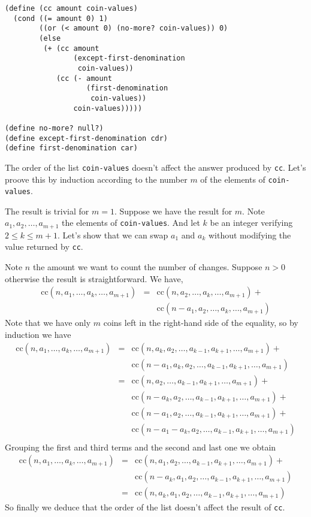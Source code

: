 \documentclass[a4paper,12pt]{article}
\begin{document}
\begin{lstlisting}
(define (cc amount coin-values)
  (cond ((= amount 0) 1)
        ((or (< amount 0) (no-more? coin-values)) 0)
        (else
         (+ (cc amount
                (except-first-denomination
                 coin-values))
            (cc (- amount
                   (first-denomination
                    coin-values))
                coin-values)))))

(define no-more? null?)
(define except-first-denomination cdr)
(define first-denomination car)
\end{lstlisting}
The order of the list \lstinline!coin-values! doesn't affect the
answer produced by \lstinline!cc!.  Let's proove this by induction
according to the number $m$ of the elements of
\lstinline!coin-values!.

The result is trivial for $m = 1$.  Suppose we have the result for
$m$.  Note $a_1, a_2, \ldots, a_{m+1}$ the elements of
\lstinline!coin-values!.  And let $k$ be an integer verifying
$ 2 \le k \le m+1$.  Let's show that we can swap $a_1$ and $a_k$
without modifying the value returned by \lstinline!cc!.

Note $n$ the amount we want to count the number of changes. Suppose
$n > 0$ otherwise the result is straightforward.  We have,
\begin{eqnarray*}
  \mathrm{cc}(n, a_1,\ldots,a_k,\ldots,a_{m+1}) &=&
  \mathrm{cc}(n, a_2,\ldots,a_k,\ldots,a_{m+1}) + \\ &&
  \mathrm{cc}(n-a_1,a_2,\ldots,a_k,\ldots,a_{m+1}) 
\end{eqnarray*}
Note that we have only $m$ coins left in the right-hand side of the
equality, so by induction we have
\begin{eqnarray*}
  \mathrm{cc}(n, a_1,\ldots,a_k,\ldots,a_{m+1}) &=&
  \mathrm{cc}(n, a_k, a_2,\ldots,a_{k-1},a_{k+1},\ldots,a_{m+1}) +
  \\&&
  \mathrm{cc}(n-a_1, a_k, a_2, \ldots, a_{k-1}, a_{k+1}, \ldots,
  a_{m+1}) \\ &=&
  \mathrm{cc}(n, a_2, \ldots, a_{k-1},a_{k+1},\ldots, a_{m+1}) + \\ &&
  \mathrm{cc}(n-a_k, a_2, \ldots, a_{k-1}, a_{k+1},\ldots,a_{m+1}) +
  \\ &&
  \mathrm{cc}(n-a_1, a_2, \ldots, a_{k-1}, a_{k+1}, \ldots, a_{m+1}) +
  \\ &&
  \mathrm{cc}(n-a_1-a_k, a_2, \ldots, a_{k-1}, a_{k+1}, \ldots,
  a_{m+1}) \\
\end{eqnarray*}
Grouping the first and third terms and the second and last one we
obtain
\newpage
\begin{eqnarray*}
  \mathrm{cc}(n, a_1,\ldots,a_k,\ldots,a_{m+1}) &=&
  \mathrm{cc}(n, a_1, a_2, \ldots, a_{k-1}, a_{k+1}, \ldots, a_{m+1}) +
  \\ &&
  \mathrm{cc}(n-a_k, a_1, a_2, \ldots, a_{k-1}, a_{k+1}, \ldots,
  a_{m+1}) \\ &=&
  \mathrm{cc}(n, a_k, a_1, a_2, \ldots, a_{k-1}, a_{k+1}, \ldots, a_{m+1})
\end{eqnarray*}
So finally we deduce that the order of the list doesn't affect the
result of \lstinline!cc!.
\end{document}
